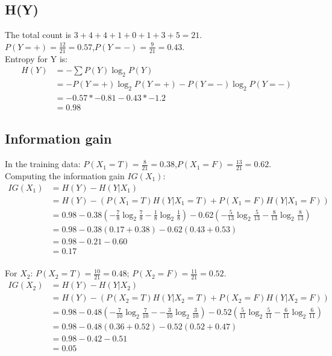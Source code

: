 \documentclass{article}
\begin{document}
\subsection{H(Y)}
The total count is $3+4+4+1+0+1+3+5=21$. \\
$P(Y=+)=\frac{12}{21}=0.57$,$P(Y=-)=\frac{9}{21}=0.43$.\\
Entropy for Y is:\\
\begin{align*}
H(Y)&=-\sum P(Y)\log_2 P(Y)\\
	 &=-P(Y=+)\log_2 P(Y=+)-P(Y=-)\log_2 P(Y=-)\\
	 &=-0.57*-0.81-0.43*-1.2\\
	 &=0.98
\end{align*}

\subsection{Information gain}
In the training data: $P(X_1=T)=\frac{8}{21}=0.38$,$P(X_1=F)=\frac{13}{21}=0.62$.\\
Computing the information gain $IG(X_1)$:\\
\begin{align*}
IG(X_1)&=H(Y)-H(Y|X_1)\\
		&=H(Y)-(P(X_1=T)H(Y|X_1=T)+P(X_1=F)H(Y|X_1=F))\\
		&=0.98-0.38({-\frac{7}{8}\log_2 \frac{7}{8}}-{\frac{1}{8}\log_2 \frac{1}{8}})-0.62({-\frac{5}{13}\log_2 \frac{5}{13}}-{\frac{8}{13}\log_2 \frac{8}{13}})\\
		&=0.98-0.38(0.17+0.38)-0.62(0.43+0.53)\\
		&=0.98-0.21-0.60\\
		&=0.17
\end{align*}\\
For $X_2$: $P(X_2=T)=\frac{10}{21}=0.48$; $P(X_2=F)=\frac{11}{21}=0.52$.\\
\begin{align*}
IG(X_2)&=H(Y)-H(Y|X_2)\\
		&=H(Y)-(P(X_2=T)H(Y|X_2=T)+P(X_2=F)H(Y|X_2=F))\\
		&=0.98-0.48({-\frac{7}{10}\log_2 \frac{7}{10}}-{-\frac{3}{10}\log_2 \frac{3}{10}})-0.52({\frac{5}{11}\log_2 \frac{5}{11}}-{\frac{6}{11}\log_2 \frac{6}{11}})\\
		&=0.98-0.48(0.36+0.52)-0.52(0.52+0.47)\\
		&=0.98-0.42-0.51\\
		&=0.05
\end{align*}
\end{document}
